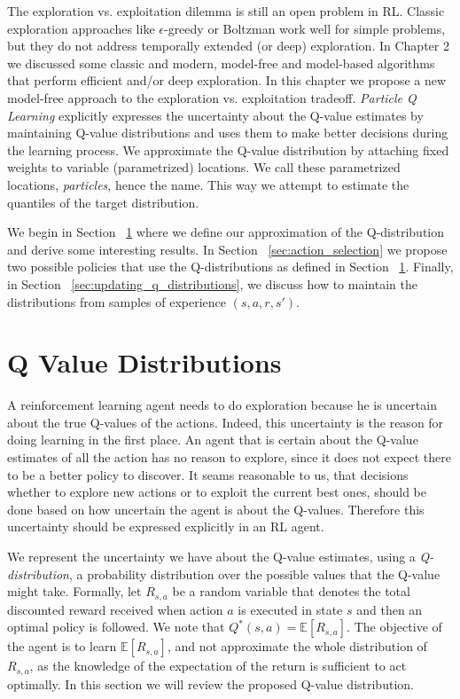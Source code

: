 The exploration vs. exploitation dilemma is still an open problem in RL. Classic exploration approaches like $\epsilon$-greedy or Boltzman work well for simple problems, but they do not address temporally extended (or deep) exploration. In Chapter 2 we discussed some classic and modern, model-free and model-based algorithms that perform efficient and/or deep exploration. In this chapter we propose a new model-free approach to the exploration vs. exploitation tradeoff. \emph{Particle Q Learning} explicitly expresses the uncertainty about the Q-value estimates by maintaining Q-value distributions and uses them to make better decisions during the learning process. We approximate the Q-value distribution by attaching fixed weights to variable (parametrized) locations. We call these parametrized locations, \emph{particles}, hence the name. This way we attempt to estimate the quantiles of the target distribution. \par
We begin in Section ~\ref{sec:q_value_distributions} where we define our approximation of the Q-distribution and derive some interesting results. In Section ~\ref{sec:action_selection} we propose two possible policies that use the Q-distributions as defined in Section ~\ref{sec:q_value_distributions}. Finally, in Section ~\ref{sec:updating_q_distributions},  we discuss how to maintain the distributions from samples of experience $(s,a,r,s')$.

\section{Q Value Distributions} \label{sec:q_value_distributions}
A reinforcement learning agent needs to do exploration because he is uncertain about the true Q-values of the actions. Indeed, this uncertainty is the reason for doing learning in the first place. An agent that is certain about the Q-value estimates of all the action has no reason to explore, since it does not expect there to be a better policy to discover. It seams reasonable to us, that decisions whether to explore new actions or to exploit the current best ones, should be done based on how uncertain the agent is about the Q-values. Therefore this uncertainty should be expressed explicitly in an RL agent.\par
We represent the uncertainty we have about the Q-value estimates, using a \emph{Q-distribution}, a probability distribution over the possible values that the Q-value might take. Formally, let $R_{s,a}$ be a random variable that denotes the total discounted reward received when action $a$ is executed in state $s$ and then an optimal policy is followed. We note that $Q^*(s,a)=\mathbb{E}[R_{s,a}]$. The objective of the agent is to learn $\mathbb{E}[R_{s,a}]$, and not approximate the whole distribution of $R_{s,a}$, as the knowledge of the expectation of the return is sufficient to act optimally. In this section we will review the proposed Q-value distribution.

